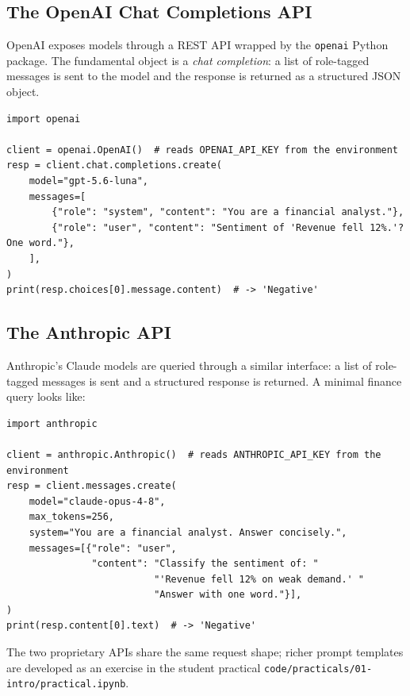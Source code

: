 \begin{deepdive}

\subsection{The OpenAI Chat Completions API}
\label{sec:api-openai}

OpenAI exposes models through a REST API wrapped by the
\texttt{openai} Python package.  The fundamental object is a
\emph{chat completion}: a list of role-tagged messages is sent to the
model and the response is returned as a structured JSON object.

\begin{verbatim}
import openai

client = openai.OpenAI()  # reads OPENAI_API_KEY from the environment
resp = client.chat.completions.create(
    model="gpt-5.6-luna",
    messages=[
        {"role": "system", "content": "You are a financial analyst."},
        {"role": "user", "content": "Sentiment of 'Revenue fell 12%.'? One word."},
    ],
)
print(resp.choices[0].message.content)  # -> 'Negative'
\end{verbatim}

\subsection{The Anthropic API}
\label{sec:api-anthropic}

Anthropic's Claude models are queried through a similar interface: a list of
role-tagged messages is sent and a structured response is returned. A minimal
finance query looks like:

\begin{verbatim}
import anthropic

client = anthropic.Anthropic()  # reads ANTHROPIC_API_KEY from the environment
resp = client.messages.create(
    model="claude-opus-4-8",
    max_tokens=256,
    system="You are a financial analyst. Answer concisely.",
    messages=[{"role": "user",
               "content": "Classify the sentiment of: "
                          "'Revenue fell 12% on weak demand.' "
                          "Answer with one word."}],
)
print(resp.content[0].text)  # -> 'Negative'
\end{verbatim}

\noindent The two proprietary APIs share the same request shape; richer prompt templates
are developed as an exercise in the student practical \texttt{code/practicals/01-intro/practical.ipynb}.


\end{deepdive}
